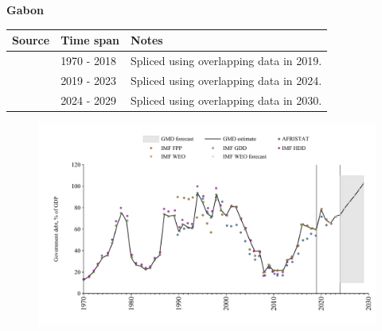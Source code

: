 \documentclass[12pt,a4paper,landscape]{article}
\begin{document}
\begin{adjustbox}{max totalsize={\paperwidth}{\paperheight},center}
\begin{minipage}[t][\textheight][t]{\textwidth}
\vspace*{0.5cm}
{}
\begin{center}
{\Large\bfseries Gabon}
\end{center}
\vspace{0.5cm}
\begin{table}[H]
\centering
\small
\begin{tabular}{|l|l|l|}
\hline
\textbf{Source} & \textbf{Time span} & \textbf{Notes} \\
\hline
\rowcolor{white}\cite{IMF_GDD}& 1970 - 2018 &Spliced using overlapping data in 2019.\\
\rowcolor{lightgray}\cite{IMF_FPP}& 2019 - 2023 &Spliced using overlapping data in 2024.\\
\rowcolor{white}\cite{IMF_WEO_forecast}& 2024 - 2029 &Spliced using overlapping data in 2030.\\
\hline
\end{tabular}
\end{table}
\begin{figure}[H]
\centering
\includegraphics[width=\textwidth,height=0.6\textheight,keepaspectratio]{graphs/GAB_govdebt_GDP.pdf}
\end{figure}
\end{minipage}
\end{adjustbox}
\end{document}
